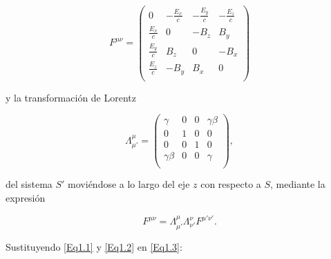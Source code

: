 \documentclass[a4paper,10pt]{article}
\begin{document}
\begin{equation}
F^{\mu\nu}=
	\begin{pmatrix}
		0					&	-\frac{E_x}{c}	&	-\frac{E_y}{c}	&	-\frac{E_z}{c}	\\
		\frac{E_x}{c}	&	0						&	-B_z					&	B_y					\\
		\frac{E_y}{c}	&	B_z					&	0						&	-B_x					\\
		\frac{E_z}{c}	&	-B_y					&	B_x					&	0						\\
	\end{pmatrix}
\label{Eq1.1}
\end{equation}

y la transformación de Lorentz

\begin{equation}
\Lambda_{\mu'}^{\mu}=
	\begin{pmatrix}
		\gamma			&	0	&	0	&	\gamma\beta	\\
		0						&	1	&	0	&	0						\\
		0						&	0	&	1	&	0						\\
		\gamma\beta	&	0	&	0	&	\gamma			\\
	\end{pmatrix},
\label{Eq1.2}
\end{equation}

del sistema $S'$ moviéndose a lo largo del eje $z$ con respecto a $S$, mediante la expresión

\begin{equation}
F^{\mu\nu}=\Lambda_{\mu'}^{\mu}\Lambda_{\nu'}^{\nu}F^{\mu'\nu'}.
\label{Eq1.3}
\end{equation}

Sustituyendo \eqref{Eq1.1} y \eqref{Eq1.2} en \eqref{Eq1.3}:
\end{document}
